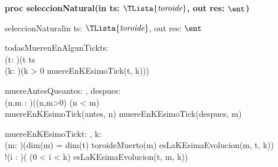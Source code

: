 \documentclass[spanish, a4paper]{article}
\begin{document}
\begin{ejercicio}[:] \textbf{proc seleccionNatural(in ts: $\TLista{\toroide}$, out res: $\ent$)}\\

\begin{proc}{seleccionNatural}{in ts: $\TLista{\toroide}$, out res: $\ent$}{}

\end{proc}

\begin{pred}{todasMuerenEnAlgunTick}{ts: \TLista{\toroide}} { \\
    (\forall t: \toroide)(t \in ts \implicaLuego \\
    (\exists k: \ent)(k > 0 \yLuego muereEnKEsimoTick(t, k))) \\
    }
\end{pred}

\begin{pred}{muereAntesQue}{antes: \toroide, despues: \toroide}{\\
    (\exists n,m : \ent)((n,m>0) \land (n < m) \\
    \land muereEnKEsimoTick(antes, n) \land muereEnKEsimoTick(despues, m) \\
}

\begin{pred}{muereEnKEsimoTick}{t: \toroide, k: \ent}{ \\
    (\exists m: \toroide)(dim(m) = dim(t) \yLuego toroideMuerto(m) \yLuego esLaKEsimaEvolucion(m, t, k)) \land \\
    !(\exists i : \ent)( (0 < i < k) \yLuego esLaKEsimaEvolucion(t, m, k))
}

\end{pred}

\end{pred}

\end{ejercicio}
\end{document}
